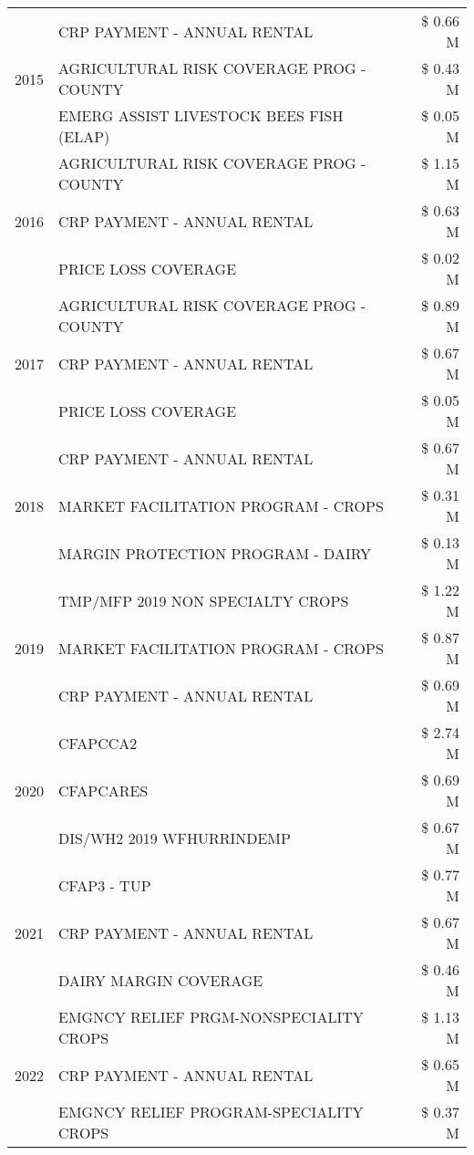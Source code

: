 \begin{tabular}{llr}
\cline{1-3}
\multirow[t]{3}{*}{2015} & CRP PAYMENT - ANNUAL RENTAL & \$ 0.66 M \\
 & AGRICULTURAL RISK COVERAGE PROG - COUNTY & \$ 0.43 M \\
 & EMERG ASSIST LIVESTOCK BEES FISH (ELAP) & \$ 0.05 M \\
\cline{1-3}
\multirow[t]{3}{*}{2016} & AGRICULTURAL RISK COVERAGE PROG - COUNTY & \$ 1.15 M \\
 & CRP PAYMENT - ANNUAL RENTAL & \$ 0.63 M \\
 & PRICE LOSS COVERAGE & \$ 0.02 M \\
\cline{1-3}
\multirow[t]{3}{*}{2017} & AGRICULTURAL RISK COVERAGE PROG - COUNTY & \$ 0.89 M \\
 & CRP PAYMENT - ANNUAL RENTAL & \$ 0.67 M \\
 & PRICE LOSS COVERAGE & \$ 0.05 M \\
\cline{1-3}
\multirow[t]{3}{*}{2018} & CRP PAYMENT - ANNUAL RENTAL & \$ 0.67 M \\
 & MARKET FACILITATION PROGRAM - CROPS & \$ 0.31 M \\
 & MARGIN PROTECTION PROGRAM - DAIRY & \$ 0.13 M \\
\cline{1-3}
\multirow[t]{3}{*}{2019} & TMP/MFP 2019 NON SPECIALTY CROPS & \$ 1.22 M \\
 & MARKET FACILITATION PROGRAM - CROPS & \$ 0.87 M \\
 & CRP PAYMENT - ANNUAL RENTAL & \$ 0.69 M \\
\cline{1-3}
\multirow[t]{3}{*}{2020} & CFAPCCA2 & \$ 2.74 M \\
 & CFAPCARES & \$ 0.69 M \\
 & DIS/WH2 2019 WFHURRINDEMP & \$ 0.67 M \\
\cline{1-3}
\multirow[t]{3}{*}{2021} & CFAP3 - TUP & \$ 0.77 M \\
 & CRP PAYMENT - ANNUAL RENTAL & \$ 0.67 M \\
 & DAIRY MARGIN COVERAGE & \$ 0.46 M \\
\cline{1-3}
\multirow[t]{3}{*}{2022} & EMGNCY RELIEF PRGM-NONSPECIALITY CROPS & \$ 1.13 M \\
 & CRP PAYMENT - ANNUAL RENTAL & \$ 0.65 M \\
 & EMGNCY RELIEF PROGRAM-SPECIALITY CROPS & \$ 0.37 M \\
\cline{1-3}
\bottomrule
\end{tabular}

